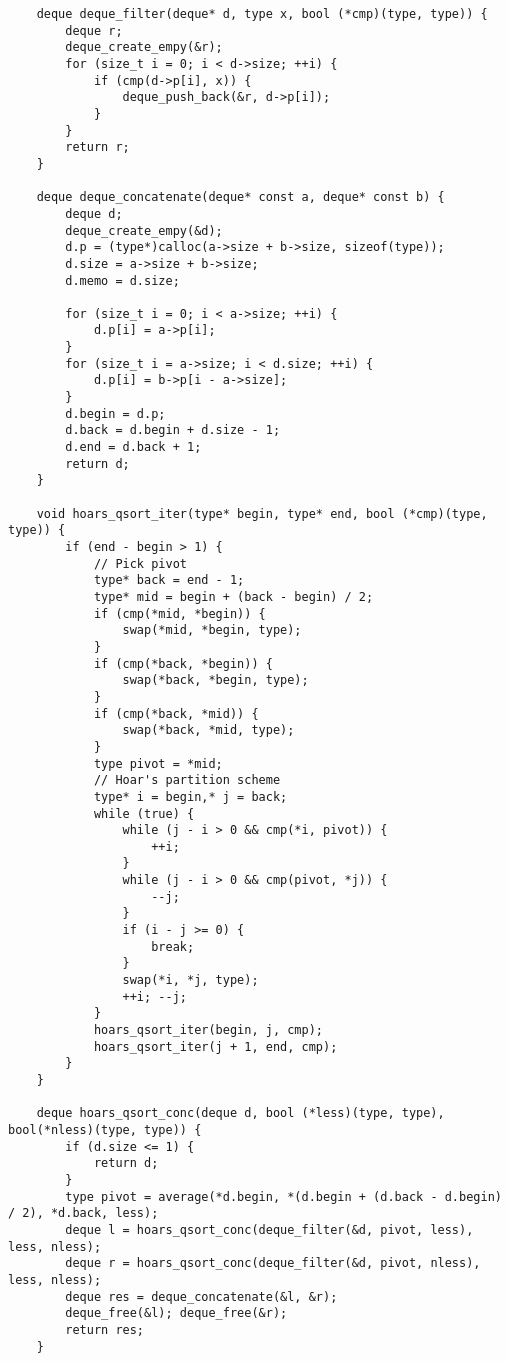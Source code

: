 \documentclass[a4paper]{article}
\newcounter{i}
\begin{document}
\begin{enumerate}[label=\textbf{\arabic*}.]
\begin{verbatim}
    deque deque_filter(deque* d, type x, bool (*cmp)(type, type)) {
        deque r;
        deque_create_empy(&r);
        for (size_t i = 0; i < d->size; ++i) {
            if (cmp(d->p[i], x)) {
                deque_push_back(&r, d->p[i]);
            }
        }
        return r;
    }
    
    deque deque_concatenate(deque* const a, deque* const b) {
        deque d;
        deque_create_empy(&d);
        d.p = (type*)calloc(a->size + b->size, sizeof(type));
        d.size = a->size + b->size;
        d.memo = d.size;
    
        for (size_t i = 0; i < a->size; ++i) {
            d.p[i] = a->p[i];
        }
        for (size_t i = a->size; i < d.size; ++i) {
            d.p[i] = b->p[i - a->size];
        }
        d.begin = d.p;
        d.back = d.begin + d.size - 1;
        d.end = d.back + 1;
        return d;
    }
    
    void hoars_qsort_iter(type* begin, type* end, bool (*cmp)(type, type)) {
        if (end - begin > 1) {
            // Pick pivot
            type* back = end - 1;
            type* mid = begin + (back - begin) / 2;
            if (cmp(*mid, *begin)) {
                swap(*mid, *begin, type);
            }
            if (cmp(*back, *begin)) {
                swap(*back, *begin, type);
            }
            if (cmp(*back, *mid)) {
                swap(*back, *mid, type);
            }
            type pivot = *mid;
            // Hoar's partition scheme
            type* i = begin,* j = back;
            while (true) {
                while (j - i > 0 && cmp(*i, pivot)) {
                    ++i;
                }
                while (j - i > 0 && cmp(pivot, *j)) {
                    --j;
                }
                if (i - j >= 0) {
                    break;
                }
                swap(*i, *j, type);
                ++i; --j;
            }
            hoars_qsort_iter(begin, j, cmp);
            hoars_qsort_iter(j + 1, end, cmp);
        }
    }
    
    deque hoars_qsort_conc(deque d, bool (*less)(type, type), bool(*nless)(type, type)) {
        if (d.size <= 1) {
            return d;
        }
        type pivot = average(*d.begin, *(d.begin + (d.back - d.begin) / 2), *d.back, less);
        deque l = hoars_qsort_conc(deque_filter(&d, pivot, less), less, nless);
        deque r = hoars_qsort_conc(deque_filter(&d, pivot, nless), less, nless);
        deque res = deque_concatenate(&l, &r);
        deque_free(&l); deque_free(&r);
        return res;
    }
    

\end{verbatim}
\end{enumerate}
\end{document}
